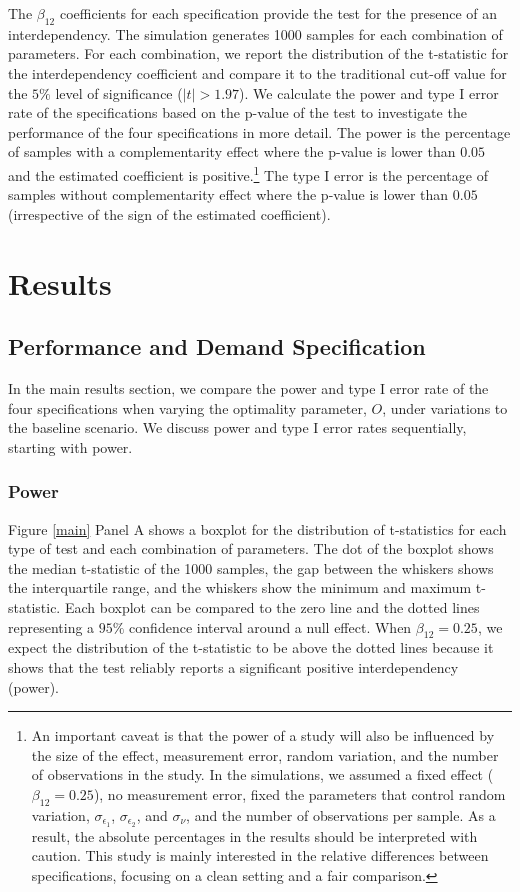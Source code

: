\documentclass[12pt]{article}
\begin{document}
The $\beta_{12}$ coefficients for each specification provide the test for the presence of an interdependency. The simulation generates 1000 samples for each combination of parameters. For each combination, we report the distribution of the t-statistic for the interdependency coefficient and compare it to the traditional cut-off value for the $5\%$ level of significance ($|t| > 1.97$). We calculate the power and type I error rate of the specifications based on the p-value of the test to investigate the performance of the four specifications in more detail. The power is the percentage of samples with a complementarity effect where the p-value is lower than $0.05$ and the estimated coefficient is positive.\footnote{An important caveat is that the power of a study will also be influenced by the size of the effect, measurement error, random variation, and the number of observations in the study. In the simulations, we assumed a fixed effect ($\beta_{12} = 0.25$), no measurement error, fixed the parameters that control random variation, $\sigma_{\epsilon_1}$, $\sigma_{\epsilon_2}$, and $\sigma_{\nu}$, and the number of observations per sample. As a result, the absolute percentages in the results should be interpreted with caution. This study is mainly interested in the relative differences between specifications, focusing on a clean setting and a fair comparison.} The type I error is the percentage of samples without complementarity effect where the p-value is lower than $0.05$ (irrespective of the sign of the estimated coefficient). 

\section{Results}
\subsection{Performance and Demand Specification}\label{performance-and-demand-function-approach}

In the main results section, we compare the power and type I error rate of the four specifications when varying the optimality parameter, $O$, under variations to the baseline scenario. We discuss power and type I error rates sequentially, starting with power.

\subsubsection{Power}\label{Power}
Figure \ref{main} Panel A shows a boxplot for the distribution of t-statistics for each type of test and each combination of parameters. The dot of the boxplot shows the median t-statistic of the 1000 samples, the gap between the whiskers shows the interquartile range, and the whiskers show the minimum and maximum t-statistic. Each boxplot can be compared to the zero line and the dotted lines representing a $95\%$ confidence interval around a null effect. When $\beta_{12} = 0.25$, we expect the distribution of the t-statistic to be above the dotted lines because it shows that the test reliably reports a significant positive interdependency (power).  
\end{document}
